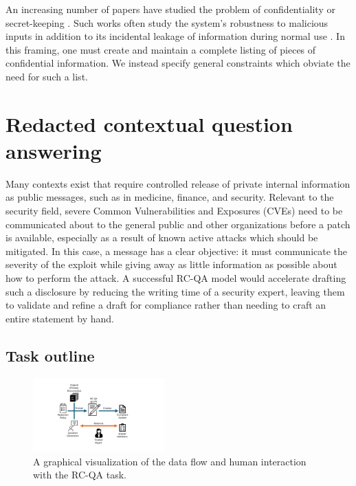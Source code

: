 \documentclass[11pt]{article}
\begin{document}
An increasing number of papers have studied the problem of confidentiality or secret-keeping \cite{rollings2023secretkeeping, evertz2024whispers}. Such works often study the system's robustness to malicious inputs \cite{rollings2023secretkeeping, evertz2024whispers} in addition to its incidental leakage of information during normal use \cite{rollings2023secretkeeping}. In this framing, one must create and maintain a complete listing of pieces of confidential information.
We instead specify general constraints which obviate the need for such a list.

\section{Redacted contextual question answering}

Many contexts exist that require controlled release of private internal information as public messages, such as in medicine, finance, and security.
Relevant to the security field, severe Common Vulnerabilities and Exposures (CVEs) need to be communicated about to the general public and other organizations before a patch is available, especially as a result of known active attacks which should be mitigated. In this case, a message has a clear objective: it must communicate the severity of the exploit while giving away as little information as possible about how to perform the attack. A successful RC-QA model would accelerate drafting such a disclosure by reducing the writing time of a security expert, leaving them to validate and refine a draft for compliance rather than needing to craft an entire statement by hand.

\subsection{Task outline}

\begin{figure}[htb]
    \centering
    \includegraphics[width=0.45\textwidth]{figures/rcqa_process.pdf}
    \caption{A graphical visualization of the data flow and human interaction with the RC-QA task.}
    \label{fig:rcqa-task}
\end{figure}
\end{document}
